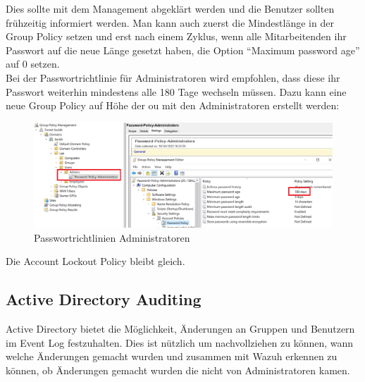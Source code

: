 Dies sollte mit dem Management abgeklärt werden und die Benutzer sollten frühzeitig informiert werden.
Man kann auch zuerst die Mindestlänge in der Group Policy setzen und erst nach einem Zyklus, wenn alle Mitarbeitenden ihr Passwort auf die neue Länge gesetzt haben, die Option ``Maximum password age'' auf 0 setzen. \\

Bei der Passwortrichtlinie für Administratoren wird empfohlen, dass diese ihr Passwort weiterhin mindestens alle 180 Tage wechseln müssen.
Dazu kann eine neue Group Policy auf Höhe der \acrshort{ou} mit den Administratoren erstellt werden:
\begin{figure}[H]
    \centering
    \includegraphics[width=\linewidth]{../img/IAM/admin-password-policy.png}
    \caption{Passwortrichtlinien Administratoren}
\end{figure}
Die Account Lockout Policy bleibt gleich.

\subsection{Active Directory Auditing}
Active Directory bietet die Möglichkeit, Änderungen an Gruppen und Benutzern im Event Log festzuhalten.
Dies ist nützlich um nachvollziehen zu können, wann welche Änderungen gemacht wurden und zusammen mit Wazuh erkennen zu können, ob Änderungen gemacht wurden die nicht von Administratoren kamen.\\

